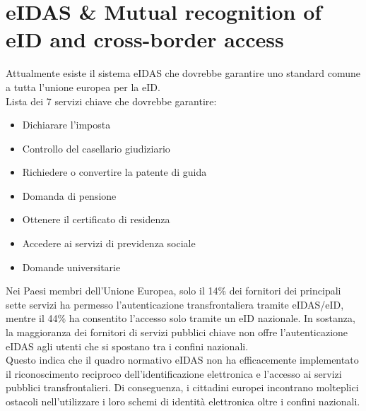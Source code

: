 \section{eIDAS \& Mutual recognition of eID and cross-border access}
Attualmente esiste il sistema eIDAS che dovrebbe garantire uno standard comune a tutta l'unione europea per la eID.\\
Lista dei 7 servizi chiave che dovrebbe garantire:
\begin{itemize}
    \item Dichiarare l'imposta
    \item Controllo del casellario giudiziario
    \item Richiedere o convertire la patente di guida
    \item Domanda di pensione
    \item Ottenere il certificato di residenza
    \item Accedere ai servizi di previdenza sociale
    \item Domande universitarie
\end{itemize}

Nei Paesi membri dell'Unione Europea, solo il 14\% dei fornitori dei principali sette servizi ha permesso l'autenticazione transfrontaliera tramite eIDAS/eID, mentre il 44\% ha consentito l'accesso solo tramite un eID nazionale. In sostanza, la maggioranza dei fornitori di servizi pubblici chiave non offre l'autenticazione eIDAS agli utenti che si spostano tra i confini nazionali.\\
Questo indica che il quadro normativo eIDAS non ha efficacemente implementato il riconoscimento reciproco dell'identificazione elettronica e l'accesso ai servizi pubblici transfrontalieri. Di conseguenza, i cittadini europei incontrano molteplici ostacoli nell'utilizzare i loro schemi di identità elettronica oltre i confini nazionali.

